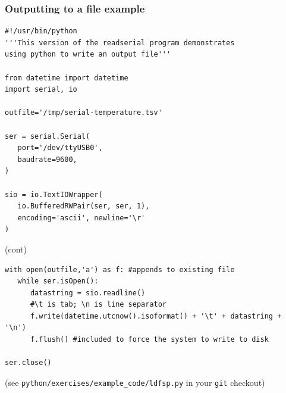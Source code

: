 \documentclass[aspectratio=1610,9pt]{beamer} %
\begin{document}
\begin{frame}[fragile]
\frametitle{Outputting to a file
example}

\begin{verbatim}
#!/usr/bin/python
'''This version of the readserial program demonstrates
using python to write an output file'''

from datetime import datetime
import serial, io

outfile='/tmp/serial-temperature.tsv'

ser = serial.Serial(
   port='/dev/ttyUSB0',
   baudrate=9600,
)

sio = io.TextIOWrapper(
   io.BufferedRWPair(ser, ser, 1),
   encoding='ascii', newline='\r'
)

\end{verbatim}
(cont)
\end{frame}
\begin{frame}[fragile]
\begin{verbatim}
with open(outfile,'a') as f: #appends to existing file
   while ser.isOpen():
      datastring = sio.readline()
      #\t is tab; \n is line separator
      f.write(datetime.utcnow().isoformat() + '\t' + datastring + '\n')
      f.flush() #included to force the system to write to disk

ser.close()
\end{verbatim}

(see \texttt{python/exercises/example\_code/ldfsp.py} in your
\texttt{git} checkout)

\end{frame}
\end{document}
